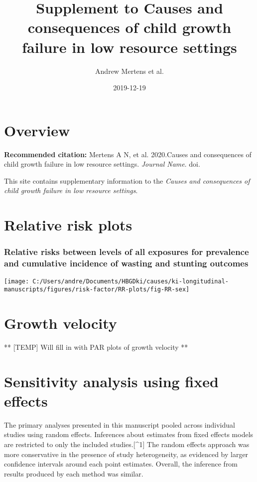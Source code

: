\documentclass[9pt,]{book}
\title{Supplement to Causes and consequences of child growth failure in low
resource settings}
\author{Andrew Mertens et al.}
\date{2019-12-19}
\begin{document}
\maketitle

{
\setcounter{tocdepth}{1}
\tableofcontents
}
\chapter{Overview}\label{overview}

\textbf{Recommended citation:} Mertens A N, et al. 2020.Causes and
consequences of child growth failure in low resource settings.
\emph{Journal Name}. doi.

This site contains supplementary information to the \emph{Causes and
consequences of child growth failure in low resource settings}.

\chapter{Relative risk plots}\label{RR}

\raggedright

\subsection{Relative risks between levels of all exposures for
prevalence and cumulative incidence of wasting and stunting
outcomes}\label{relative-risks-between-levels-of-all-exposures-for-prevalence-and-cumulative-incidence-of-wasting-and-stunting-outcomes}

\texttt{[image: C:/Users/andre/Documents/HBGDki/causes/ki-longitudinal-manuscripts/figures/risk-factor/RR-plots/fig-RR-sex]}

\chapter{Growth velocity}\label{velocity}

\raggedright

** {[}TEMP{]} Will fill in with PAR plots of growth velocity **

\chapter{Sensitivity analysis using fixed effects}\label{fixed-effects}

\raggedright

The primary analyses presented in this manuscript pooled across
individual studies using random effects. Inferences about estimates from
fixed effects models are restricted to only the included
studies.{[}\^{}1{]} The random effects approach was more conservative in
the presence of study heterogeneity, as evidenced by larger confidence
intervals around each point estimates. Overall, the inference from
results produced by each method was similar.
\end{document}
